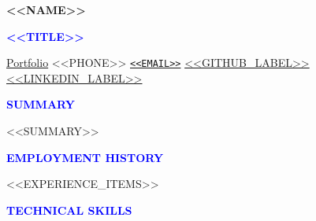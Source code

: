 \documentclass[a4paper,11pt]{letter}
\begin{document}

\begin{minipage}[t]{0.63\textwidth}
    \huge \textbf{<<NAME>>}
\end{minipage}%
\begin{minipage}[t]{0.35\textwidth}
    \raggedleft
    \large \textbf{\textcolor{blue}{<<TITLE>>}}
\end{minipage}

\vspace{-18pt}
\noindent\textcolor{blue}{\hrulefill}
\vspace{-8pt}

\faGlobe \hspace{3pt} \href{<<PORTFOLIO_URL>>}{Portfolio}\hspace{3pt}
\faPhone \hspace{3pt} <<PHONE>> \hspace{3pt}
\faEnvelope \hspace{3pt} \href{mailto:<<EMAIL>>}{\nolinkurl{<<EMAIL>>}} \hspace{3pt}
\faGithub \hspace{3pt} \href{<<GITHUB_URL>>}{<<GITHUB_LABEL>>} \hspace{6pt}
\faLinkedin \hspace{3pt} \href{<<LINKEDIN_URL>>}{<<LINKEDIN_LABEL>>}

\vspace{1pt}
\begin{center}
\textcolor{blue}{\MakeUppercase{\textbf{\Large{Summary}}}}
\end{center}
\vspace{-25pt}
\textcolor{blue}{\hrulefill}
\vspace{-10pt}

\justifying <<SUMMARY>>

\vspace{0pt}
\begin{center}
\textcolor{blue}{\MakeUppercase{\textbf{\Large{Employment History}}}}
\end{center}
\vspace{-25pt}
\textcolor{blue}{\hrulefill}
\vspace{-10pt}

<<EXPERIENCE_ITEMS>>

\begin{center}
    \vspace{0pt}
    \textcolor{blue}{\MakeUppercase{\textbf{\Large{Technical Skills}}}}
    \vspace{-25pt}
\end{center}
\textcolor{blue}{\hrulefill}
\vspace{-10pt}
\end{document}
